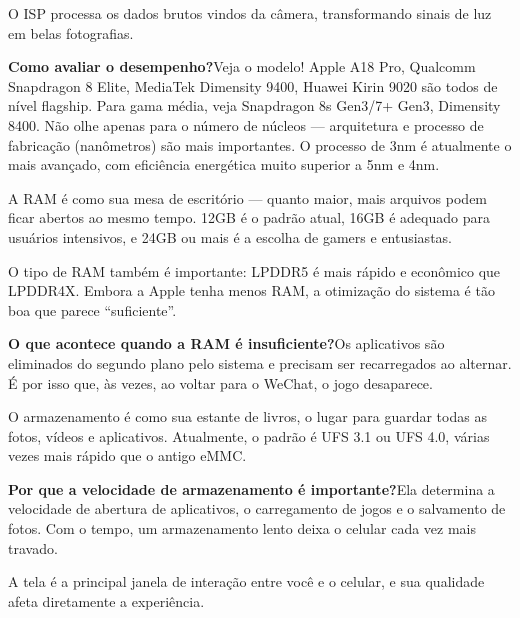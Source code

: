 O ISP processa os dados brutos vindos da câmera, transformando sinais de luz em belas fotografias.

\textbf{Como avaliar o desempenho?}Veja o modelo! Apple A18 Pro, Qualcomm Snapdragon 8 Elite, MediaTek Dimensity 9400, Huawei Kirin 9020 são todos de nível flagship. Para gama média, veja Snapdragon 8s Gen3/7+ Gen3, Dimensity 8400. Não olhe apenas para o número de núcleos — arquitetura e processo de fabricação (nanômetros) são mais importantes. O processo de 3nm é atualmente o mais avançado, com eficiência energética muito superior a 5nm e 4nm.


A RAM é como sua mesa de escritório — quanto maior, mais arquivos podem ficar abertos ao mesmo tempo. 12GB é o padrão atual, 16GB é adequado para usuários intensivos, e 24GB ou mais é a escolha de gamers e entusiastas.

O tipo de RAM também é importante: LPDDR5 é mais rápido e econômico que LPDDR4X. Embora a Apple tenha menos RAM, a otimização do sistema é tão boa que parece “suficiente”.

\textbf{O que acontece quando a RAM é insuficiente?}Os aplicativos são eliminados do segundo plano pelo sistema e precisam ser recarregados ao alternar. É por isso que, às vezes, ao voltar para o WeChat, o jogo desaparece.


O armazenamento é como sua estante de livros, o lugar para guardar todas as fotos, vídeos e aplicativos. Atualmente, o padrão é UFS 3.1 ou UFS 4.0, várias vezes mais rápido que o antigo eMMC.

\textbf{Por que a velocidade de armazenamento é importante?}Ela determina a velocidade de abertura de aplicativos, o carregamento de jogos e o salvamento de fotos. Com o tempo, um armazenamento lento deixa o celular cada vez mais travado.


A tela é a principal janela de interação entre você e o celular, e sua qualidade afeta diretamente a experiência.

